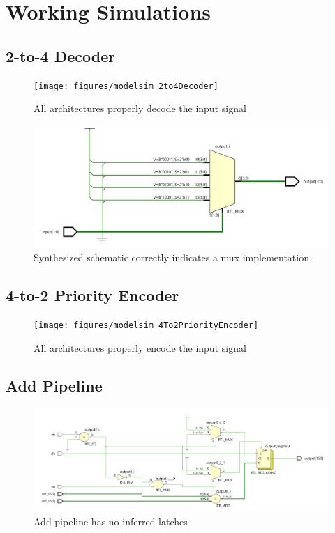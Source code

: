 \documentclass{article}
\begin{document}



\section{Working Simulations}

\subsection{2-to-4 Decoder}
\begin{figure}[H]
	\centering
	\texttt{[image: figures/modelsim\_2to4Decoder]}
	\caption{All architectures properly decode the input signal}
	\label{fig:modelsim2to4decoder}
\end{figure}
\begin{figure}[H]
	\centering
	\includegraphics[width=0.5\linewidth]{figures/decoderSchematic}
	\caption{Synthesized schematic correctly indicates a mux implementation}
	\label{fig:modelsim2to4decoder}
\end{figure}

\subsection{4-to-2 Priority Encoder}
\begin{figure}[H]
	\centering
	\texttt{[image: figures/modelsim\_4To2PriorityEncoder]}
	\caption{All architectures properly encode the input signal}
	\label{fig:modelsim4to2priorityencoder}
\end{figure}

\subsection{Add Pipeline}
\begin{figure}[H]
	\centering
	\includegraphics[width=\linewidth]{figures/add_pipe}
	\caption{Add pipeline has no inferred latches}
\end{figure}
\end{document}
